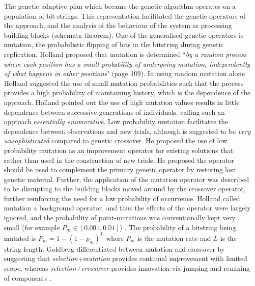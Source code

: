The genetic adaptive plan which became the genetic algorithm operates on a population of bit-strings. This representation facilitated the genetic operators of the approach, and the analysis of the behaviour of the system as processing building blocks (schemata theorem). One of the generalised genetic operators is mutation, the probabilistic flipping of bits in the bitstring during genetic replication. Holland proposed that mutation is determined ``\emph{by a random process where each position has a small probability of undergoing  mutation, independently of what happens in other positions}" \cite{Holland1992} (page 109). In using random mutation alone Holland suggested the use of small mutation probabilities such that the process provides a high probability of maintaining history, which is the dependence of the approach. Holland pointed out the use of high mutation values results in little dependence between successive generations of individuals, calling such an approach \emph{essentially enumerative}. Low probability mutation facilitates the dependence between observations and new trials, although is suggested to be \emph{very unsophisticated} compared to genetic crossover. He proposed the use of low probability mutation as an improvement operator for existing solutions that rather than used in the construction of new trials. He proposed the operator should be used to complement the primary genetic operator by restoring lost genetic material. Further, the application of the mutation operator was described to be disrupting to the building blocks moved around by the crossover operator, further reinforcing the need for a low probability of occurrence. Holland called mutation a background operator, and thus the effects of the operator were largely ignored, and the probability of point-mutations was conventionally kept very small (for example $P_m \in  \left[0.001,0.01\right]$) \cite{Goldberg1989a, Back2000}. The probability of a bitstring being mutated is $P_m = 1 - (1-p_{m})^L$ where $P_m$ is the mutation rate and $L$ is the string length. Goldberg differentiated between mutation and crossover by suggesting that \emph{selection+mutation} provides continual improvement with limited scope, whereas \emph{selection+crossover} provides innovation via jumping and remixing of components \cite{Goldberg2002}. 

